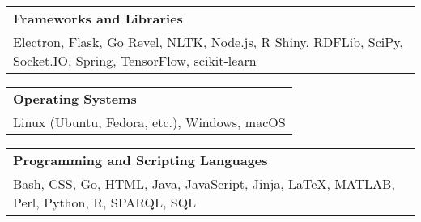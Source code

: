 \documentclass[10pt]{article}
\newcommand{\tabularxwidth}{\textwidth}
\begin{document}
        
            \vspace{.5em}
        

    
        \begin{tabularx}{\tabularxwidth}{X}
            \textbf{Frameworks and Libraries} \\
            
    
            Electron, 
            Flask, 
            Go Revel, 
            NLTK, 
            Node.js, 
            R Shiny, 
            RDFLib, 
            SciPy, 
            Socket.IO, 
            Spring, 
            TensorFlow, 
            scikit-learn \\
        \end{tabularx}

        
            \vspace{.5em}
        

    
        \begin{tabularx}{\tabularxwidth}{X}
            \textbf{Operating Systems} \\
            
    
            Linux (Ubuntu, Fedora, etc.), 
            Windows, 
            macOS \\
        \end{tabularx}

        
            \vspace{.5em}
        

    
        \begin{tabularx}{\tabularxwidth}{X}
            \textbf{Programming and Scripting Languages} \\
            
    
            Bash, 
            CSS, 
            Go, 
            HTML, 
            Java, 
            JavaScript, 
            Jinja, 
            LaTeX, 
            MATLAB, 
            Perl, 
            Python, 
            R, 
            SPARQL, 
            SQL \\
        \end{tabularx}
\end{document}
